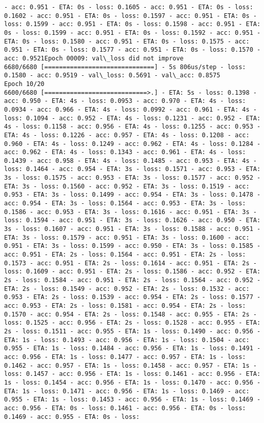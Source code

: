 \documentclass[11pt]{article}
\begin{document}
\begin{Verbatim}[commandchars=\\\{\}]
- acc: 0.951 - ETA: 0s - loss: 0.1605 - acc: 0.951 - ETA: 0s - loss: 0.1602 - acc: 0.951 - ETA: 0s - loss: 0.1597 - acc: 0.951 - ETA: 0s - loss: 0.1599 - acc: 0.951 - ETA: 0s - loss: 0.1598 - acc: 0.951 - ETA: 0s - loss: 0.1599 - acc: 0.951 - ETA: 0s - loss: 0.1592 - acc: 0.951 - ETA: 0s - loss: 0.1580 - acc: 0.951 - ETA: 0s - loss: 0.1575 - acc: 0.951 - ETA: 0s - loss: 0.1577 - acc: 0.951 - ETA: 0s - loss: 0.1570 - acc: 0.9521Epoch 00009: val\_loss did not improve
6680/6680 [==============================] - 5s 806us/step - loss: 0.1580 - acc: 0.9519 - val\_loss: 0.5691 - val\_acc: 0.8575
Epoch 10/20
6600/6680 [============================>.] - ETA: 5s - loss: 0.1398 - acc: 0.950 - ETA: 4s - loss: 0.0953 - acc: 0.970 - ETA: 4s - loss: 0.0934 - acc: 0.966 - ETA: 4s - loss: 0.0992 - acc: 0.961 - ETA: 4s - loss: 0.1094 - acc: 0.952 - ETA: 4s - loss: 0.1231 - acc: 0.952 - ETA: 4s - loss: 0.1158 - acc: 0.956 - ETA: 4s - loss: 0.1255 - acc: 0.953 - ETA: 4s - loss: 0.1226 - acc: 0.957 - ETA: 4s - loss: 0.1208 - acc: 0.960 - ETA: 4s - loss: 0.1249 - acc: 0.962 - ETA: 4s - loss: 0.1284 - acc: 0.962 - ETA: 4s - loss: 0.1343 - acc: 0.961 - ETA: 4s - loss: 0.1439 - acc: 0.958 - ETA: 4s - loss: 0.1485 - acc: 0.953 - ETA: 4s - loss: 0.1464 - acc: 0.954 - ETA: 3s - loss: 0.1571 - acc: 0.953 - ETA: 3s - loss: 0.1575 - acc: 0.953 - ETA: 3s - loss: 0.1577 - acc: 0.952 - ETA: 3s - loss: 0.1560 - acc: 0.952 - ETA: 3s - loss: 0.1519 - acc: 0.953 - ETA: 3s - loss: 0.1499 - acc: 0.954 - ETA: 3s - loss: 0.1478 - acc: 0.954 - ETA: 3s - loss: 0.1564 - acc: 0.953 - ETA: 3s - loss: 0.1586 - acc: 0.953 - ETA: 3s - loss: 0.1616 - acc: 0.951 - ETA: 3s - loss: 0.1594 - acc: 0.951 - ETA: 3s - loss: 0.1626 - acc: 0.950 - ETA: 3s - loss: 0.1607 - acc: 0.951 - ETA: 3s - loss: 0.1588 - acc: 0.951 - ETA: 3s - loss: 0.1579 - acc: 0.951 - ETA: 3s - loss: 0.1600 - acc: 0.951 - ETA: 3s - loss: 0.1599 - acc: 0.950 - ETA: 3s - loss: 0.1585 - acc: 0.951 - ETA: 2s - loss: 0.1564 - acc: 0.951 - ETA: 2s - loss: 0.1573 - acc: 0.951 - ETA: 2s - loss: 0.1614 - acc: 0.951 - ETA: 2s - loss: 0.1609 - acc: 0.951 - ETA: 2s - loss: 0.1586 - acc: 0.952 - ETA: 2s - loss: 0.1584 - acc: 0.951 - ETA: 2s - loss: 0.1564 - acc: 0.952 - ETA: 2s - loss: 0.1549 - acc: 0.952 - ETA: 2s - loss: 0.1532 - acc: 0.953 - ETA: 2s - loss: 0.1539 - acc: 0.954 - ETA: 2s - loss: 0.1577 - acc: 0.953 - ETA: 2s - loss: 0.1581 - acc: 0.954 - ETA: 2s - loss: 0.1570 - acc: 0.954 - ETA: 2s - loss: 0.1548 - acc: 0.955 - ETA: 2s - loss: 0.1525 - acc: 0.956 - ETA: 2s - loss: 0.1528 - acc: 0.955 - ETA: 2s - loss: 0.1511 - acc: 0.955 - ETA: 1s - loss: 0.1490 - acc: 0.956 - ETA: 1s - loss: 0.1493 - acc: 0.956 - ETA: 1s - loss: 0.1504 - acc: 0.955 - ETA: 1s - loss: 0.1484 - acc: 0.956 - ETA: 1s - loss: 0.1491 - acc: 0.956 - ETA: 1s - loss: 0.1477 - acc: 0.957 - ETA: 1s - loss: 0.1462 - acc: 0.957 - ETA: 1s - loss: 0.1458 - acc: 0.957 - ETA: 1s - loss: 0.1457 - acc: 0.956 - ETA: 1s - loss: 0.1461 - acc: 0.956 - ETA: 1s - loss: 0.1454 - acc: 0.956 - ETA: 1s - loss: 0.1470 - acc: 0.956 - ETA: 1s - loss: 0.1471 - acc: 0.956 - ETA: 1s - loss: 0.1469 - acc: 0.955 - ETA: 1s - loss: 0.1453 - acc: 0.956 - ETA: 1s - loss: 0.1469 - acc: 0.956 - ETA: 0s - loss: 0.1461 - acc: 0.956 - ETA: 0s - loss: 0.1469 - acc: 0.955 - ETA: 0s - loss: 
\end{Verbatim}
\end{document}
